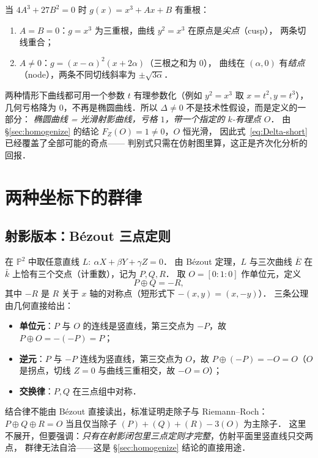 \documentclass[10pt,a4paper]{article}
\numberwithin{equation}{section}
\begin{document}
当 $4A^{3}+27B^{2}=0$ 时 $g(x)=x^{3}+Ax+B$ 有重根：

\begin{enumerate}
\item $A=B=0$：$g=x^{3}$ 为三重根，曲线 $y^{2}=x^{3}$ 在原点是\emph{尖点}（cusp），
   两条切线重合；
\item $A\neq0$：$g=(x-\alpha)^{2}(x+2\alpha)$（三根之和为 $0$），
   曲线在 $(\alpha,0)$ 有\emph{结点}（node），两条不同切线斜率为 $\pm\sqrt{3\alpha}$．
\end{enumerate}

两种情形下曲线都可用一个参数 $t$ 有理参数化（例如 $y^{2}=x^{3}$ 取 $x=t^{2},y=t^{3}$），
几何亏格降为 $0$，不再是椭圆曲线．所以 $\Delta\neq0$ 不是技术性假设，而是定义的一部分：
\emph{椭圆曲线 = 光滑射影曲线，亏格 $1$，带一个指定的 $k$-有理点 $O$}．
由 \S\ref{sec:homogenize} 的结论 $F_{Z}(O)=1\neq0$，$O$ 恒光滑，
因此式~\eqref{eq:Delta-short} 已经覆盖了全部可能的奇点——
判别式只需在仿射图里算，这正是齐次化分析的回报．

\section{两种坐标下的群律}\label{sec:group-law}

\subsection{射影版本：Bézout 三点定则}

在 $\mathbb P^{2}$ 中取任意直线 $L:\ \alpha X+\beta Y+\gamma Z=0$．
由 Bézout 定理，$L$ 与三次曲线 $\overline E$ 在 $\bar k$ 上恰有三个交点（计重数），记为 $P,Q,R$．
取 $O=[0:1:0]$ 作单位元，定义
\[
P\oplus Q = -R ,
\]
其中 $-R$ 是 $R$ 关于 $x$ 轴的对称点（短形式下 $-(x,y)=(x,-y)$）．
三条公理由几何直接给出：

\begin{itemize}
\item \textbf{单位元}：$P$ 与 $O$ 的连线是竖直线，第三交点为 $-P$，故 $P\oplus O=-(-P)=P$；
\item \textbf{逆元}：$P$ 与 $-P$ 连线为竖直线，第三交点为 $O$，故 $P\oplus(-P)=-O=O$（$O$ 是拐点，切线 $Z=0$ 与曲线三重相交，故 $-O=O$）；
\item \textbf{交换律}：$P,Q$ 在三点组中对称．
\end{itemize}
结合律不能由 Bézout 直接读出，标准证明走除子与 Riemann--Roch：
$P\oplus Q\oplus R=O$ 当且仅当除子 $(P)+(Q)+(R)-3(O)$ 为主除子．
这里不展开，但要强调：\emph{只有在射影闭包里三点定则才完整}，仿射平面里竖直线只交两点，
群律无法自洽——这是 \S\ref{sec:homogenize} 结论的直接用途．
\end{document}
